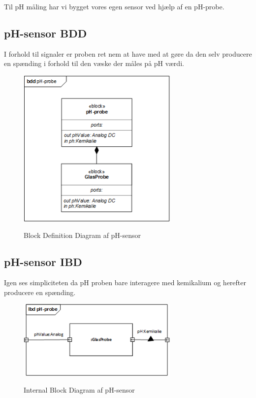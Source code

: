 
Til pH måling har vi bygget vores egen sensor ved hjælp af en pH-probe.

\subsection{pH-sensor BDD}

I forhold til signaler er proben ret nem at have med at gøre da den selv producere en spænding i forhold til den væske der måles på pH værdi.

\begin{figure}[H]
	\centering
	\includegraphics[width=0.7\textwidth]{Systemarkitektur/Sensor_pH/pH_Probe_BDD.png}
	\label{fig:pH-sensor BDD}
	\caption{Block Definition Diagram af pH-sensor}
\end{figure}



\subsection{pH-sensor IBD}

Igen ses simpliciteten da pH proben bare interagere med kemikalium og herefter producere en spænding.

\begin{figure}[H]
	\centering
	\includegraphics[width=0.7\textwidth]{Systemarkitektur/Sensor_pH/pH_Probe_IBD.png}
	\label{fig:pH-sensor IBD}
	\caption{Internal Block Diagram af pH-sensor}
\end{figure}


